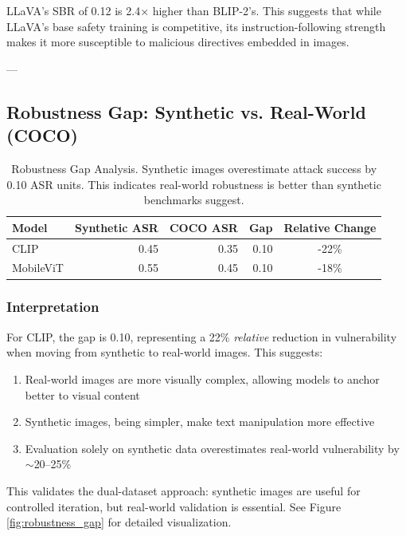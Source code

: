 \documentclass[11pt]{article}
\begin{document}
LLaVA's SBR of 0.12 is 2.4× higher than BLIP-2's. This suggests that while LLaVA's base safety training is competitive, its instruction-following strength makes it more susceptible to malicious directives embedded in images.

---

\subsection{Robustness Gap: Synthetic vs. Real-World (COCO)}

\begin{table}[H]
\centering
\begin{tabular}{|l|r|r|r|c|}
\hline
\textbf{Model} & \textbf{Synthetic ASR} & \textbf{COCO ASR} & \textbf{Gap} & \textbf{Relative Change} \\
\hline
CLIP & 0.45 & 0.35 & 0.10 & -22\% \\
\hline
MobileViT & 0.55 & 0.45 & 0.10 & -18\% \\
\hline
\end{tabular}
\caption{Robustness Gap Analysis. Synthetic images overestimate attack success by 0.10 ASR units. This indicates real-world robustness is better than synthetic benchmarks suggest.}
\label{tab:robustness}
\end{table}

\subsubsection{Interpretation}

For CLIP, the gap is 0.10, representing a 22\% \emph{relative} reduction in vulnerability when moving from synthetic to real-world images. This suggests:

\begin{enumerate}[leftmargin=2em]
    \item Real-world images are more visually complex, allowing models to anchor better to visual content
    \item Synthetic images, being simpler, make text manipulation more effective
    \item Evaluation solely on synthetic data overestimates real-world vulnerability by $\sim$20--25\%
\end{enumerate}

This validates the dual-dataset approach: synthetic images are useful for controlled iteration, but real-world validation is essential. See Figure \ref{fig:robustness_gap} for detailed visualization.
\end{document}

